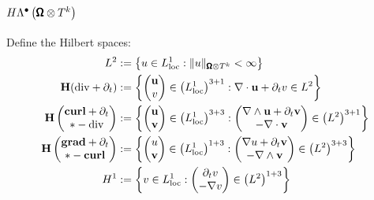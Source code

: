        \subsection*{$H\Lambda^{\bullet}\left(\pmb{\mathsf{\Omega}}\otimes T^{k}\right)$}
            Define the Hilbert spaces:
            \begin{align}
                L^{2}  &:=  \left\{u \in L^{1}_{\rm loc} : \|u\|_{\pmb{\mathsf{\Omega}}\otimes T^{k}} < \infty\right\}  \\
                \mathbf{H}(\mathrm{div} + \partial_{t})  &:=  \left\{\begin{pmatrix} \mathbf{u} \\ v \end{pmatrix} \in \left(L^{1}_{\rm loc}\right)^{3 + 1} : \nabla\cdot\mathbf{u} + \partial_{t}v \in L^{2}\right\}  \\
                \mathbf{H}\left(\begin{matrix} \mathbf{curl} + \partial_{t} \\ * - \mathrm{div} \end{matrix}\right)  &:=  \left\{\begin{pmatrix} \mathbf{u} \\ \mathbf{v} \end{pmatrix} \in \left(L^{1}_{\rm loc}\right)^{3 + 3} : \begin{pmatrix} \nabla\wedge\mathbf{u} + \partial_{t}\mathbf{v} \\ - \nabla\cdot\mathbf{v} \end{pmatrix} \in \left(L^{2}\right)^{3 + 1}\right\}  \\
                \mathbf{H}\left(\begin{matrix} \mathbf{grad} + \partial_{t} \\ * - \mathbf{curl} \end{matrix}\right)  &:=  \left\{\begin{pmatrix} u \\ \mathbf{v} \end{pmatrix} \in \left(L^{1}_{\rm loc}\right)^{1 + 3} : \begin{pmatrix} \nabla u + \partial_{t}\mathbf{v} \\ - \nabla\wedge\mathbf{v} \end{pmatrix} \in \left(L^{2}\right)^{3 + 3}\right\}  \\
                H^{1}  &:=  \left\{v \in L^{1}_{\rm loc} : \begin{pmatrix} \partial_{t}v \\ - \nabla v \end{pmatrix} \in \left(L^{2}\right)^{1 + 3}\right\}
            \end{align}
